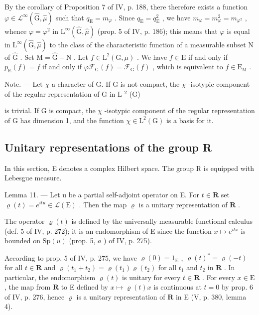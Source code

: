 By the corollary of Proposition 7 of IV, p. 188, there therefore exists a function \(\varphi \in \mathcal{L}^{\infty}(\widehat{\mathrm{G}},\widehat{\mu})\) such that \(q_{\mathrm{E}} = m_{\varphi}\) . Since \(q_{\mathrm{E}} = q_{\mathrm{E}}^{2}\) , we have \(m_{\varphi} = m_{\varphi}^{2} = m_{\varphi^{2}}\) , whence \(\varphi = \varphi^{2}\) in \(\mathrm{L}^{\infty}(\widehat{\mathrm{G}},\widehat{\mu})\) (prop. 5 of IV, p. 186); this means that \(\varphi\) is equal in \(\mathrm{L}^{\infty}(\widehat{\mathrm{G}},\widehat{\mu})\) to the class of the characteristic function of a measurable subset N of \(\widehat{\mathrm{G}}\) . Set \(\mathrm{M} = \widehat{\mathrm{G}} - \mathrm{N}\) . Let \(f \in \mathrm{L}^{2}(\mathrm{G},\mu)\) . We have \(f \in \mathrm{E}\) if and only if \(p_{\mathrm{E}}(f) = f\) if and only if \(\varphi \mathcal{F}_{\mathrm{G}}(f) = \mathcal{F}_{\mathrm{G}}(f)\) , which is equivalent to \(f \in \mathrm{E}_{\mathrm{M}}\) .

Note. --- Let \(\chi\) a character of G. If G is not compact, the \(\chi\) -isotypic component of the regular representation of G in L \(^{2}\) (G)

is trivial. If G is compact, the \(\chi\) -isotypic component of the regular representation of G has dimension 1, and the function \(\chi \in \mathrm{L}^{2}(\mathrm{G})\) is a basis for it.

\subsection{Unitary representations of the group R}

In this section, E denotes a complex Hilbert space. The group R is equipped with Lebesgue measure.

Lemma 11. --- Let u be a partial self-adjoint operator on E. For \(t \in \mathbf{R}\) set \(\varrho(t) = e^{itu} \in \mathcal{L}(\mathrm{E})\) . Then the map \(\varrho\) is a unitary representation of \(\mathbf{R}\) .

The operator \(\varrho(t)\) is defined by the universally measurable functional calculus (def. 5 of IV, p. 272); it is an endomorphism of E since the function \(x \mapsto e^{itx}\) is bounded on \(\mathrm{Sp}(u)\) (prop. 5, \(a\) ) of IV, p. 275).

According to prop. 5 of IV, p. 275, we have \(\varrho(0) = 1_{\mathrm{E}}\) , \(\varrho(t)^* = \varrho(-t)\) for all \(t \in \mathbf{R}\) and \(\varrho(t_1 + t_2) = \varrho(t_1)\varrho(t_2)\) for all \(t_1\) and \(t_2\) in \(\mathbf{R}\) . In particular, the endomorphism \(\varrho(t)\) is unitary for every \(t \in \mathbf{R}\) . For every \(x \in \mathrm{E}\) , the map from \(\mathbf{R}\) to E defined by \(x \mapsto \varrho(t)x\) is continuous at \(t = 0\) by prop. 6 of IV, p. 276, hence \(\varrho\) is a unitary representation of \(\mathbf{R}\) in E (V, p. 380, lemma 4).


